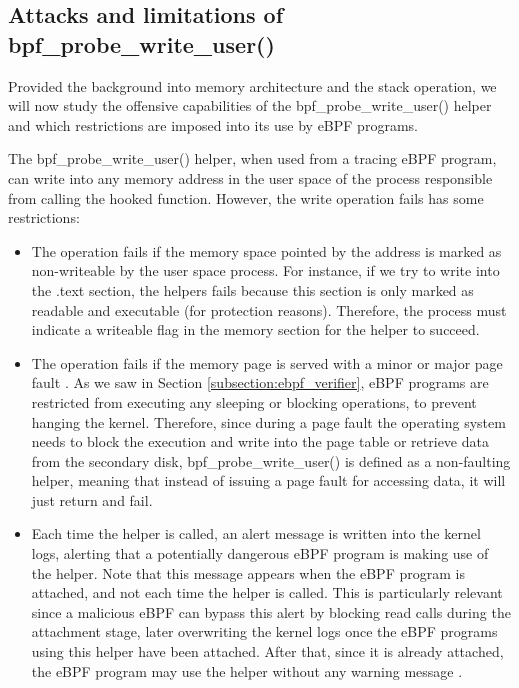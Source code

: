 \subsection{Attacks and limitations of bpf\_probe\_write\_user()} \label{subsection:bpf_probe_write_apps}
Provided the background into memory architecture and the stack operation, we will now study the offensive capabilities of the bpf\_probe\_write\_user() helper and which restrictions are imposed into its use by eBPF programs.

The bpf\_probe\_write\_user() helper, when used from a tracing eBPF program, can write into any memory address in the user space of the process responsible from calling the hooked function. However, the write operation fails has some restrictions:
\begin{itemize}
\item{The operation fails if the memory space pointed by the address is marked as non-writeable by the user space process. For instance, if we try to write into the .text section, the helpers fails because this section is only marked as readable and executable (for protection reasons).} Therefore, the process must indicate a writeable flag in the memory section for the helper to succeed.
\item{The operation fails if the memory page is served with a minor or major page fault \cite{bpf_probe_write_user_errors}. As we saw in Section \ref{subsection:ebpf_verifier}, eBPF programs are restricted from executing any sleeping or blocking operations, to prevent hanging the kernel. Therefore, since during a page fault the operating system needs to block the execution and write into the page table or retrieve data from the secondary disk, bpf\_probe\_write\_user() is defined as a non-faulting helper\cite{write_helper_non_fault}, meaning that instead of issuing a page fault for accessing data, it will just return and fail.}
\item{Each time the helper is called, an alert message is written into the kernel logs, alerting that a potentially dangerous eBPF program is making use of the helper. Note that this message appears when the eBPF program is attached, and not each time the helper is called. This is particularly relevant since a malicious eBPF can bypass this alert by blocking read calls during the attachment stage, later overwriting the kernel logs once the eBPF programs using this helper have been attached. After that, since it is already attached, the eBPF program may use the helper without any warning message \cite{ebpf_friends_54}.}
\end{itemize}

